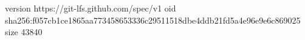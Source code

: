 version https://git-lfs.github.com/spec/v1
oid sha256:f057cb1ce1865aa773458653336c29511518dbe4ddb21fd5a4e96e9e6c869025
size 43840
